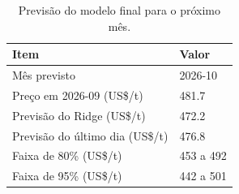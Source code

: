 \begin{table}
\caption{Previsão do modelo final para o próximo mês.}
\label{tab:tab6_previsao}
\begin{tabular}{ll}
\toprule
Item & Valor \\
\midrule
Mês previsto & 2026-10 \\
Preço em 2026-09 (US\$/t) & 481.7 \\
Previsão do Ridge (US\$/t) & 472.2 \\
Previsão do último dia (US\$/t) & 476.8 \\
Faixa de 80\% (US\$/t) & 453 a 492 \\
Faixa de 95\% (US\$/t) & 442 a 501 \\
\bottomrule
\end{tabular}
\end{table}
